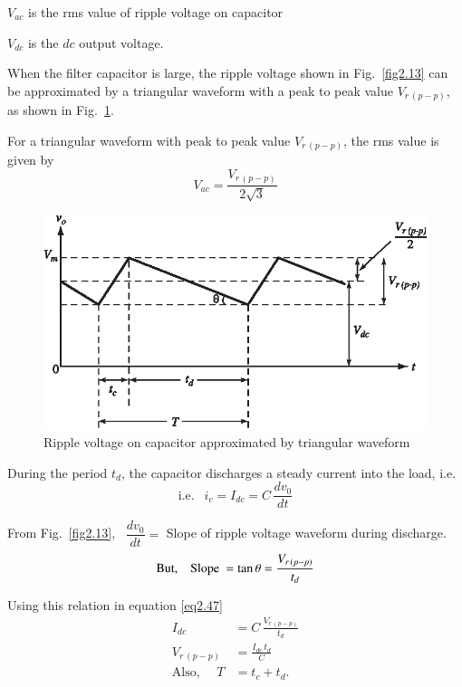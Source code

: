 $V_{ac}$ is the rms value of ripple voltage on capacitor

$V_{dc}$ is the $dc$ output voltage.

When the filter capacitor is large, the ripple voltage shown in
Fig.~\ref{fig2.13} can be approximated by a triangular waveform with a peak to
peak value $V_{r\,(p-p)}$, as shown in Fig.~\ref{fig2.14}.

For a triangular waveform with peak to peak value $V_{r\,(p-p)}$, the
rms value is given by
\begin{equation}
V_{ac} = \frac{V_{r\,(p-p)}}{2 \sqrt{3}} \label{eq2.46}
\end{equation}
\begin{figure}[H]
\centering
\includegraphics{chap2/add-fig/S3-EE-02-014.eps}
\caption{Ripple voltage on capacitor approximated by triangular waveform}\label{fig2.14}
\end{figure}

During the period $t_d$, the capacitor discharges a steady current
into the load, i.e.
\begin{equation}
\text{i.e. } ~~ i_c = I_{dc} = C\, \frac{dv_0}{dt} \label{eq2.47}
\end{equation}

From Fig.~\ref{fig2.13}, \ $\dfrac{dv_0}{dt} =$ Slope of ripple voltage waveform
during discharge.
$$
\text{But,\quad Slope } = \tan \theta = \frac{V_{r\,(p-p)}}{t_d}
$$

Using this relation in equation \eqref{eq2.47}
\begin{align}
I_{dc} & = C\,\frac{V_{r\,(p-p)}}{t_d} \label{eq2.48}\\
V_{r\,(p-p)} & = \frac{I_{dc}\, t_d}{C} \label{eq2.49}\\
\text{Also, \ } \quad T & = t_c + t_d. \label{eq2.50} 
\end{align}

